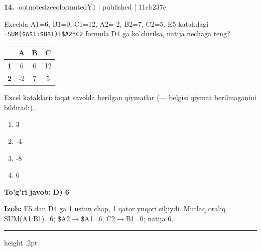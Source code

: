 \documentclass[10pt,a4paper]{article}
\begin{document}
\textbf{\color{ink}14.} {ootnotesizecolor{muted}Y1 | published | 11cb237e}
\par
Excelda A1=6, B1=0, C1=12, A2=-2, B2=7, C2=5. E5 katakdagi \texttt{=SUM(\$A\$1:\$B\$1)+\$A2*C2} formula D4 ga ko'chirilsa, natija nechaga teng?
\begin{center}\begingroup\small\setlength{\tabcolsep}{9pt}\renewcommand{\arraystretch}{1.28}
\begin{tabular}{|>{\columncolor{gray!12}}c|c|c|c|}
\hline
\rowcolor{gray!12} \textbf{} & \textbf{A} & \textbf{B} & \textbf{C}\\ \hline
\textbf{1} & 6 & 0 & 12\\ \hline
\textbf{2} & -2 & 7 & 5\\ \hline
\end{tabular}\endgroup\par{\footnotesize\color{muted}Excel kataklari: faqat savolda berilgan qiymatlar (--- belgisi qiymat berilmaganini bildiradi).}\end{center}
\begin{enumerate}[label=\Alph*),leftmargin=9mm]
\item 3
\item -4
\item -8
\item 6
\end{enumerate}
\begin{tcolorbox}[enhanced,breakable,colback=teal!4,colframe=teal!55!black,boxrule=0.45pt,arc=1.2mm,left=2.8mm,right=2.8mm,top=2mm,bottom=2mm]
\textbf{\color{teal}To'g'ri javob:} \textbf{D) 6}
\par\smallskip
\textbf{Izoh:} E5 dan D4 ga 1 ustun chap, 1 qator yuqori siljiydi. Mutlaq oraliq SUM(A1:B1)=6; \$A2\ensuremath{\rightarrow}\$A1=6, C2\ensuremath{\rightarrow}B1=0; natija 6.
\end{tcolorbox}
\vspace{2mm}\hrule height .2pt\vspace{2mm}
\end{document}
